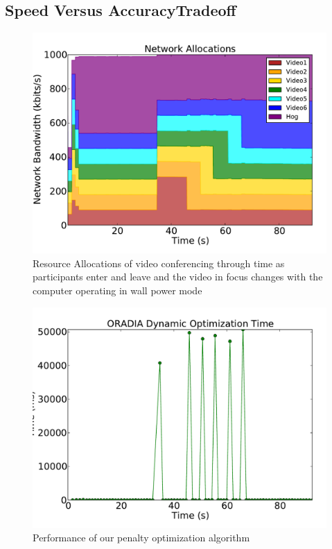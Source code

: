 \subsection*{Speed Versus AccuracyTradeoff}

\begin{figure}[!t]
	\begin{center}	
		\includegraphics[width=\columnwidth]{dyn-alloc-wp-ns-40ms.pdf}
		\caption{Resource Allocations of video conferencing through time as participants enter and leave and the video in focus changes with the computer operating in wall power mode}
		\label{video_experiment_wp_40ms}
	\end{center}
\end{figure}

\begin{figure}[!t]
	\begin{center}	
		\includegraphics[bb=0 0 576 432,width=\columnwidth]{opt_time-40ms.pdf}
		\caption{Performance of our penalty optimization algorithm}
		\label{optimization_perf_40ms}
	\end{center}
\end{figure}


